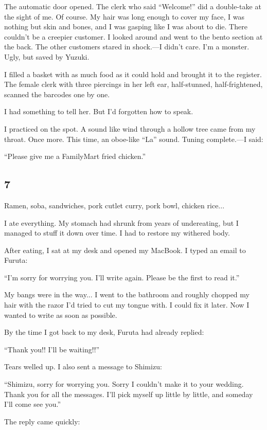 \documentclass[
    a4paper,
    12pt,
    twoside,
    openany,
    UTF8,
    fontset=windows
]{ctexbook}
\begin{document}
The automatic door opened. The clerk who said ``Welcome!'' did a double-take at the sight of me. Of course. My hair was long enough to cover my face, I was nothing but skin and bones, and I was gasping like I was about to die. There couldn't be a creepier customer. I looked around and went to the bento section at the back. The other customers stared in shock.---I didn't care. I'm a monster. Ugly, but saved by Yuzuki.

I filled a basket with as much food as it could hold and brought it to the register. The female clerk with three piercings in her left ear, half-stunned, half-frightened, scanned the barcodes one by one.

I had something to tell her. But I'd forgotten how to speak.

I practiced on the spot. A sound like wind through a hollow tree came from my throat. Once more. This time, an oboe-like ``La'' sound. Tuning complete.---I said:

``Please give me a FamilyMart fried chicken.''

\subsection*{7}

Ramen, soba, sandwiches, pork cutlet curry, pork bowl, chicken rice...

I ate everything. My stomach had shrunk from years of undereating, but I managed to stuff it down over time. I had to restore my withered body.

After eating, I sat at my desk and opened my MacBook. I typed an email to Furuta:

``I'm sorry for worrying you. I'll write again. Please be the first to read it.''

My bangs were in the way... I went to the bathroom and roughly chopped my hair with the razor I'd tried to cut my tongue with. I could fix it later. Now I wanted to write as soon as possible.

By the time I got back to my desk, Furuta had already replied:

``Thank you!! I'll be waiting!!''

Tears welled up. I also sent a message to Shimizu:

``Shimizu, sorry for worrying you. Sorry I couldn't make it to your wedding. Thank you for all the messages. I'll pick myself up little by little, and someday I'll come see you.''

The reply came quickly:
\end{document}
